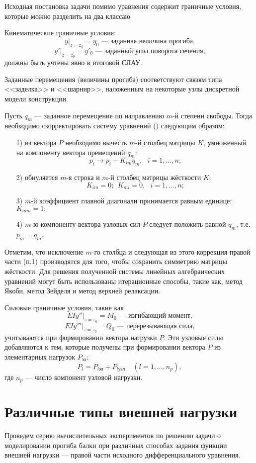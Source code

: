 \documentclass[12pt,a4paper]{article}
\begin{document}
Исходная постановка задачи помимо уравнения содержит граничные условия, которые можно разделить на два классаю

Кинематические граничные условия: 
$$ y|_{z=z_{0}}=y_{0} \text{ --- заданная величина прогиба,}$$
$$y'|_{z=z_{0}}=y'_{0} \text{ ---  заданный угол поворота сечения,}$$
должны быть учтены явно в итоговой СЛАУ.

Заданные перемещения (величины прогиба) соответствуют связям типа <<заделка>> и <<шарнир>>, наложенным на некоторые узлы дискретной модели конструкции. 

Пусть $q_{m}$ --- заданное перемещение по направлению $m$-й степени свободы. Тогда необходимо скорректировать систему уравнений () следующим образом:
\begin{enumerate}
\item[1)] из вектора $P$ необходимо вычесть $m$-й столбец матрицы $K$, умноженный на компоненту вектора премещений $q_{m}:$
$$p_{i} \to p_{i}-K_{im}q_{m}, ~~~ i=1,\ldots,n;$$
\item[2)] обнуляется $m$-я строка и $m$-й столбец матрицы жёсткости $K$:
$$K_{im}=0;~~K_{mi}=0,~~~ i=1,\ldots,n;$$
\item[3)] $m$-й коэффициент главной диагонали принимается равным единице: $K_{mm}=1;$
\item[4)] $m$-ю компоненту вектора узловых сил $P$ следует положить равной $q_{m}$, т.е. $p_{m}=q_{m}$.
\end{enumerate}

Отметим, что исключение $m$-го столбца и следующая из этого коррекция правой части (п.1) производятся для того, чтобы сохранить симметрию матрицы жёсткости. Для решения полученной системы линейных алгебраических уравнений могут быть использованы итерационные способы, такие как, метод Якоби, метод Зейделя и метод верхней релаксации.

Силовые граничные условия, такие как 
$$EIy''|_{z=z_{0}}=M_{0} \text{ --- изгибающий момент,}$$
$$EIy'''|_{z=z_{0}}= Q_{0} \text{ --- перерезывающая сила,}$$
учитываются при формировании вектора нагрузки $P$. Эти узловые силы добавляются к тем, которые получены при формировании вектора $P$ из элементарных нагрузок $P_{\text{эл}}$:
$$P_{l}= P_{l \text{эл}}+P_{l \text{узл}}~~~~~ (l=1,\ldots,n_{p}),$$
где $n_{p}$ --- число компонент узловой нагрузки.


\section{Различные типы внешней нагрузки}
Проведем серию вычислительных экспериментов по решению задачи о моделировании прогиба балки при различных способах задания функции внешней нагрузки --- правой части исходного дифференциального уравнения.
\end{document}
